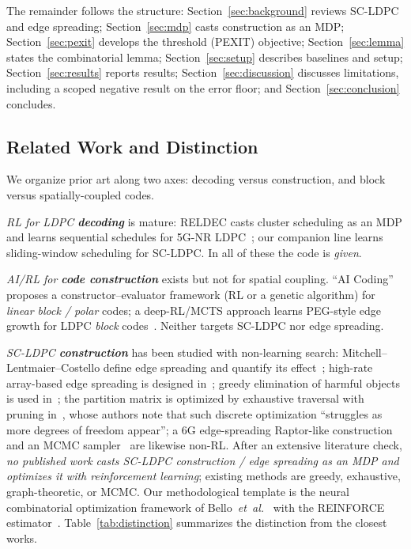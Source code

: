 \documentclass[journal]{IEEEtran}
\begin{document}
The remainder follows the structure: Section~\ref{sec:background} reviews
SC-LDPC and edge spreading; Section~\ref{sec:mdp} casts construction as an MDP;
Section~\ref{sec:pexit} develops the threshold (PEXIT) objective;
Section~\ref{sec:lemma} states the combinatorial lemma;
Section~\ref{sec:setup} describes baselines and setup;
Section~\ref{sec:results} reports results;
Section~\ref{sec:discussion} discusses limitations, including a scoped negative
result on the error floor; and Section~\ref{sec:conclusion} concludes.

\subsection{Related Work and Distinction}\label{sec:related}
We organize prior art along two axes: decoding versus construction, and block
versus spatially-coupled codes.

\emph{RL for LDPC \textbf{decoding}} is mature: RELDEC casts cluster scheduling
as an MDP and learns sequential schedules for 5G-NR LDPC~\cite{habib2023reldec};
our companion line learns sliding-window scheduling for SC-LDPC. In all of these
the code is \emph{given}.

\emph{AI/RL for \textbf{code construction}} exists but not for spatial coupling.
``AI Coding''~\cite{huang2020aicoding} proposes a constructor--evaluator
framework (RL or a genetic algorithm) for \emph{linear block / polar} codes;
a deep-RL/MCTS approach learns PEG-style edge growth for LDPC \emph{block}
codes~\cite{zhang2018ldpcdrl}. Neither targets SC-LDPC nor edge spreading.

\emph{SC-LDPC \textbf{construction}} has been studied with non-learning search:
Mitchell--Lentmaier--Costello define edge spreading and quantify its
effect~\cite{mitchell2015scldpc}; high-rate array-based edge spreading is
designed in~\cite{mitchell2017edgespreading}; greedy elimination of harmful
objects is used in~\cite{battaglioni2019harmful}; the partition matrix is
optimized by exhaustive traversal with pruning
in~\cite{esfahanizadeh2022unified,hareedy2025adaptorregress}, whose authors note
that such discrete optimization ``struggles as more degrees of freedom appear'';
a 6G edge-spreading Raptor-like construction~\cite{ren2024esrl} and an MCMC
sampler~\cite{tanrikulu2025mcmc} are likewise non-RL. After an extensive
literature check, \emph{no published work casts SC-LDPC construction / edge
spreading as an MDP and optimizes it with reinforcement learning}; existing
methods are greedy, exhaustive, graph-theoretic, or MCMC. Our methodological
template is the neural combinatorial optimization framework of
Bello~\textit{et~al.}~\cite{bello2016neural} with the REINFORCE
estimator~\cite{williams1992reinforce}. Table~\ref{tab:distinction} summarizes
the distinction from the closest works.
\end{document}
